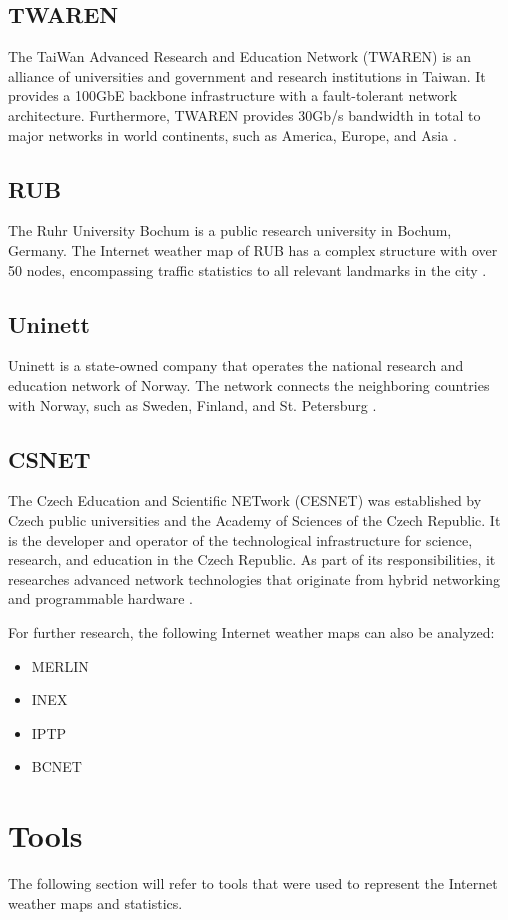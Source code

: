 \documentclass[sigconf,authorversion,nonacm]{acmart}
\begin{document}
\subsection{TWAREN}
The TaiWan Advanced Research and Education Network (TWAREN) is an alliance of universities and government and research institutions in Taiwan. It provides a 100GbE backbone infrastructure with a fault-tolerant network architecture. Furthermore, TWAREN provides 30Gb/s bandwidth in total to major networks in world continents, such as America, Europe, and Asia \cite{TWAREN}.
\subsection{RUB}
The Ruhr University Bochum is a public research university in Bochum, Germany. The Internet weather map of RUB has a complex structure with over 50 nodes, encompassing traffic statistics to all relevant landmarks in the city \cite{rub}.
\subsection{Uninett}
Uninett is a state-owned company that operates the national research and education network of Norway. The network connects the neighboring countries with Norway, such as Sweden, Finland, and St. Petersburg \cite{Uninett}.
\subsection{CSNET}
The Czech Education and Scientific NETwork (CESNET) was established by Czech public universities and the Academy of Sciences of the Czech Republic. It is the developer and operator of the technological infrastructure for science, research, and education in the Czech Republic. As part of its responsibilities, it researches advanced network technologies that originate from hybrid networking and programmable hardware \cite{CESNET}.

For further research, the following Internet weather maps can also be analyzed: 
\begin{itemize}
    \item MERLIN \cite{merlin}
    \item INEX \cite{inex}
    \item IPTP \cite{iptp}
    \item BCNET \cite{Bcnet}
\end{itemize}
\section{Tools}
The following section will refer to tools that were used to represent the Internet weather maps and statistics.
\end{document}
